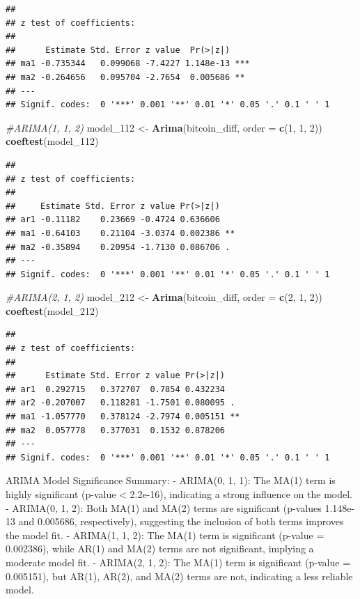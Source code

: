 \documentclass[
]{book}
\newenvironment{Shaded}{\begin{snugshade}}{\end{snugshade}}
\newcommand{\AttributeTok}[1]{\textcolor[rgb]{0.13,0.29,0.53}{#1}}
\newcommand{\CommentTok}[1]{\textcolor[rgb]{0.56,0.35,0.01}{\textit{#1}}}
\newcommand{\DecValTok}[1]{\textcolor[rgb]{0.00,0.00,0.81}{#1}}
\newcommand{\FunctionTok}[1]{\textcolor[rgb]{0.13,0.29,0.53}{\textbf{#1}}}
\newcommand{\NormalTok}[1]{#1}
\newcommand{\OtherTok}[1]{\textcolor[rgb]{0.56,0.35,0.01}{#1}}
\begin{document}
\begin{verbatim}
## 
## z test of coefficients:
## 
##      Estimate Std. Error z value  Pr(>|z|)    
## ma1 -0.735344   0.099068 -7.4227 1.148e-13 ***
## ma2 -0.264656   0.095704 -2.7654  0.005686 ** 
## ---
## Signif. codes:  0 '***' 0.001 '**' 0.01 '*' 0.05 '.' 0.1 ' ' 1
\end{verbatim}

\begin{Shaded}
\begin{Highlighting}[]
\CommentTok{\#ARIMA(1, 1, 2)}
\NormalTok{model\_112 }\OtherTok{\textless{}{-}} \FunctionTok{Arima}\NormalTok{(bitcoin\_diff, }\AttributeTok{order =} \FunctionTok{c}\NormalTok{(}\DecValTok{1}\NormalTok{, }\DecValTok{1}\NormalTok{, }\DecValTok{2}\NormalTok{))}
\FunctionTok{coeftest}\NormalTok{(model\_112)}
\end{Highlighting}
\end{Shaded}

\begin{verbatim}
## 
## z test of coefficients:
## 
##     Estimate Std. Error z value Pr(>|z|)   
## ar1 -0.11182    0.23669 -0.4724 0.636606   
## ma1 -0.64103    0.21104 -3.0374 0.002386 **
## ma2 -0.35894    0.20954 -1.7130 0.086706 . 
## ---
## Signif. codes:  0 '***' 0.001 '**' 0.01 '*' 0.05 '.' 0.1 ' ' 1
\end{verbatim}

\begin{Shaded}
\begin{Highlighting}[]
\CommentTok{\#ARIMA(2, 1, 2)}
\NormalTok{model\_212 }\OtherTok{\textless{}{-}} \FunctionTok{Arima}\NormalTok{(bitcoin\_diff, }\AttributeTok{order =} \FunctionTok{c}\NormalTok{(}\DecValTok{2}\NormalTok{, }\DecValTok{1}\NormalTok{, }\DecValTok{2}\NormalTok{))}
\FunctionTok{coeftest}\NormalTok{(model\_212)}
\end{Highlighting}
\end{Shaded}

\begin{verbatim}
## 
## z test of coefficients:
## 
##      Estimate Std. Error z value Pr(>|z|)   
## ar1  0.292715   0.372707  0.7854 0.432234   
## ar2 -0.207007   0.118281 -1.7501 0.080095 . 
## ma1 -1.057770   0.378124 -2.7974 0.005151 **
## ma2  0.057778   0.377031  0.1532 0.878206   
## ---
## Signif. codes:  0 '***' 0.001 '**' 0.01 '*' 0.05 '.' 0.1 ' ' 1
\end{verbatim}

ARIMA Model Significance Summary:
- ARIMA(0, 1, 1): The MA(1) term is highly significant (p-value \textless{} 2.2e-16), indicating a strong influence on the model.
- ARIMA(0, 1, 2): Both MA(1) and MA(2) terms are significant (p-values 1.148e-13 and 0.005686, respectively), suggesting the inclusion of both terms improves the model fit.
- ARIMA(1, 1, 2): The MA(1) term is significant (p-value = 0.002386), while AR(1) and MA(2) terms are not significant, implying a moderate model fit.
- ARIMA(2, 1, 2): The MA(1) term is significant (p-value = 0.005151), but AR(1), AR(2), and MA(2) terms are not, indicating a less reliable model.
\end{document}
